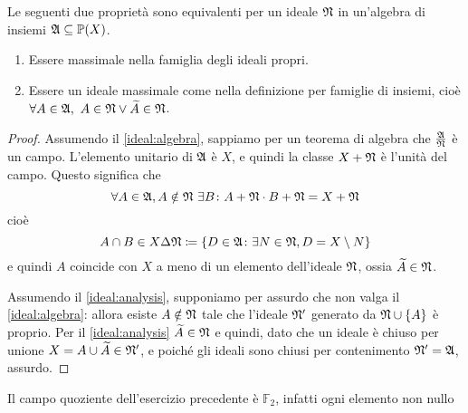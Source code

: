 \documentclass[../EserciziIstituzioniAnalisi.tex]{subfiles}
\begin{document}
\begin{exercise}[13/10/2016]
  Le seguenti due proprietà sono equivalenti per un ideale $\mathfrak N$ in un'algebra di insiemi $\mathfrak A \subseteq \mathbb P(X)$.
  \begin{enumerate}
    \item \label{ideal:algebra} Essere massimale nella famiglia degli ideali propri. 
    \item \label{ideal:analysis} Essere un ideale massimale come nella definizione per famiglie di insiemi, cioè $\forall A\in \mathfrak A,\ A\in\mathfrak N \lor \widetilde{A}\in\mathfrak N$.
  \end{enumerate}
\end{exercise}
\begin{proof}
  Assumendo il \cref{ideal:algebra}, sappiamo per un teorema di algebra che $\frac{\mathfrak A}{\mathfrak N}$ è un campo. L'elemento unitario di $\mathfrak A$ è $X$, e quindi la classe $X+\mathfrak N$ è l'unità del campo.  
  Questo significa che
  \begin{equation*}
    \forall A \in \mathfrak A, A \notin \mathfrak N\ \exists B \colon A+\mathfrak N \cdot B+\mathfrak N = X+\mathfrak N
  \end{equation*}
  cioè
  \begin{equation*}
    A \cap B \in X \Delta \mathfrak N \coloneqq \{D\in \mathfrak A \colon \exists N\in \mathfrak N, D = X\setminus N \}
  \end{equation*}
  e quindi $A$ coincide con $X$ a meno di un elemento dell'ideale $\mathfrak N$, ossia $\widetilde{A}\in \mathfrak N$.

  Assumendo il \cref{ideal:analysis}, supponiamo per assurdo che non valga il \cref{ideal:algebra}: allora esiste $A\notin \mathfrak N$ tale che l'ideale $\mathfrak N'$ generato da $\mathfrak N\cup \{A\}$ è proprio. Per il \cref{ideal:analysis} $\widetilde{A}\in \mathfrak N$ e quindi, dato che un ideale è chiuso per unione $X=A\cup\widetilde{A}\in \mathfrak N'$, e poiché gli ideali sono chiusi per contenimento $\mathfrak N'=\mathfrak A$, assurdo.
\end{proof}
\begin{remark}
  Il campo quoziente dell'esercizio precedente è $\mathbb{F}_2$, infatti ogni elemento non nullo 
\end{remark}
\end{document}
